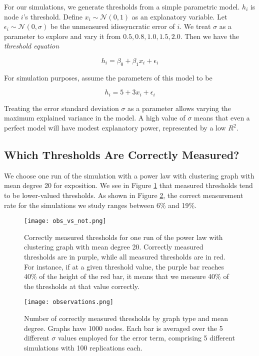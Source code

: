 \documentclass[a4paper]{article}
\begin{document}
For our simulations, we generate thresholds from a simple parametric model. $h_i$ is node $i$'s threshold. Define $x_i \sim \mathcal{N}(0, 1)$ as an explanatory variable. Let $\epsilon_i \sim \mathcal{N}(0, \sigma)$ be the unmeasured idiosyncratic error of $i$. We treat $\sigma$ as a parameter to explore and vary it from ${0.5, 0.8, 1.0, 1.5, 2.0}$. Then we have the \emph{threshold equation}

\begin{equation} \label{eq:thresh}
h_i = \beta_0 + \beta_1 x_i + \epsilon_i
\end{equation}

\noindent
For simulation purposes, assume the parameters of this model to be

\begin{equation} \label{eq:sim_thresh}
h_i = 5 + 3 x_i + \epsilon_i
\end{equation}

\noindent
Treating the error standard deviation $\sigma$ as a parameter allows varying the maximum explained variance in the model. A high value of $\sigma$ means that even a perfect model will have modest explanatory power, represented by a low $R^2$.

\subsection{Which Thresholds Are Correctly Measured?}

We choose one run of the simulation with a power law with clustering graph with mean degree 20 for exposition. We see in Figure \ref{fig:obs_vs_not} that measured thresholds tend to be lower-valued thresholds. As shown in Figure \ref{fig:obs_rate}, the correct measurement rate for the simulations we study ranges between 6\% and 19\%.

\begin{figure}[h]
\label{fig:obs_vs_not}
\texttt{[image: obs\_vs\_not.png]}
\caption{Correctly measured thresholds for one run of the power law with clustering graph with mean degree 20. Correctly measured thresholds are in purple, while all measured thresholds are in red. For instance, if at a given threshold value, the purple bar reaches 40\% of the height of the red bar, it means that we measure 40\% of the thresholds at that value correctly.}
\end{figure}

\begin{figure}[h]
\label{fig:obs_rate}
\texttt{[image: observations.png]}
\caption{Number of correctly measured thresholds by graph type and mean degree. Graphs have 1000 nodes. Each bar is averaged over the 5 different $\sigma$ values employed for the error term, comprising 5 different simulations with 100 replications each.}
\end{figure}
\end{document}
